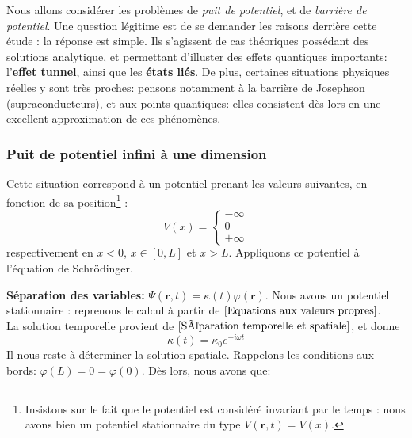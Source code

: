 \documentclass[../notesdecours]{subfiles}
\begin{document}
Nous allons considérer les problèmes de \textit{puit de potentiel}, et de\textit{ barrière de potentiel}. Une question légitime est de se demander les raisons derrière cette étude : la réponse est simple. Ils s'agissent de cas théoriques possédant des solutions analytique, et permettant d'illuster des effets quantiques importants: l'\textbf{effet tunnel}, ainsi que les \textbf{états liés}. De plus, certaines situations physiques réelles y sont très proches: pensons notamment à la barrière de Josephson (supraconducteurs), et aux points quantiques: elles consistent dès lors en une excellent approximation de ces phénomènes.\\

\subsubsection{Puit de potentiel infini à une dimension}

Cette situation correspond à un potentiel prenant les valeurs suivantes, en fonction de sa position\footnote{Insistons sur le fait que le potentiel est considéré invariant par le temps : nous avons bien un potentiel stationnaire du type $V(\bm{r},t) = V(x)$.} : 
\begin{equation}
V(x) = 
\begin{cases}
-\infty\\
0\\
+\infty
\end{cases}
\end{equation}
respectivement en $x < 0$, $x \in [0,L]$ et $x >L$. Appliquons ce potentiel à l'équation de Schrödinger.

\textbf{Séparation des variables:} $\Psi(\bm{r},t) = \kappa(t)\varphi(\bm{r})$. Nous avons un potentiel stationnaire : reprenons le calcul à partir de $\eqref{Equations aux valeurs propres}$.\\

La solution temporelle provient de $\eqref{Séparation temporelle et spatiale}$, et donne 
\begin{equation}
\kappa(t) = \kappa_0 e^{-i \omega t}
\end{equation}
Il nous reste à déterminer la solution spatiale. Rappelons les conditions aux bords:  $\varphi(L) = 0 = \varphi(0)$. Dès lors, nous avons que:\\
\end{document}
